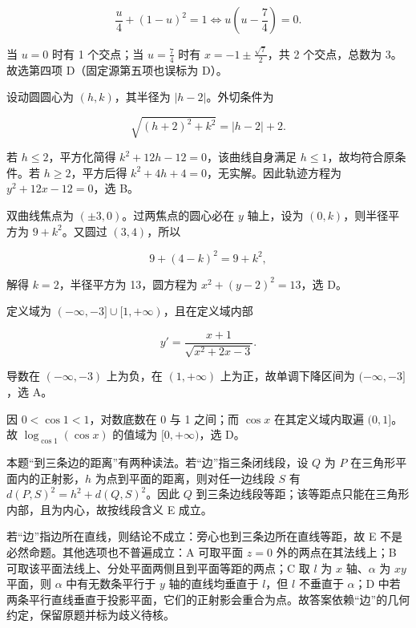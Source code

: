 \begin{answer}
\nopagebreak[4]
\[
\frac u4+(1-u)^2=1
\Longleftrightarrow u\left(u-\frac74\right)=0.
\]

当 $u=0$ 时有 1 个交点；当 $u=\frac74$ 时有 $x=-1\pm\frac{\sqrt7}{2}$，共 2 个交点，总数为 3。故选第四项 D（固定源第五项也误标为 D）。


设动圆圆心为 $(h,k)$，其半径为 $|h-2|$。外切条件为

\nopagebreak[4]
\[
\sqrt{(h+2)^2+k^2}=|h-2|+2.
\]

若 $h\le2$，平方化简得 $k^2+12h-12=0$，该曲线自身满足 $h\le1$，故均符合原条件。若 $h\ge2$，平方后得 $k^2+4h+4=0$，无实解。因此轨迹方程为 $y^2+12x-12=0$，选 B。


双曲线焦点为 $(\pm3,0)$。过两焦点的圆心必在 $y$ 轴上，设为 $(0,k)$，则半径平方为 $9+k^2$。又圆过 $(3,4)$，所以

\nopagebreak[4]
\[
9+(4-k)^2=9+k^2,
\]

解得 $k=2$，半径平方为 13，圆方程为 $x^2+(y-2)^2=13$，选 D。


定义域为 $(-\infty,-3]\cup[1,+\infty)$，且在定义域内部

\nopagebreak[4]
\[
y'=\frac{x+1}{\sqrt{x^2+2x-3}}.
\]

导数在 $(-\infty,-3)$ 上为负，在 $(1,+\infty)$ 上为正，故单调下降区间为 $(-\infty,-3]$，选 A。


因 $0<\cos1<1$，对数底数在 0 与 1 之间；而 $\cos x$ 在其定义域内取遍 $(0,1]$。故 $\log_{\cos1}(\cos x)$ 的值域为 $[0,+\infty)$，选 D。


本题“到三条边的距离”有两种读法。若“边”指三条闭线段，设 $Q$ 为 $P$ 在三角形平面内的正射影，$h$ 为点到平面的距离，则对任一边线段 $S$ 有 $d(P,S)^2=h^2+d(Q,S)^2$。因此 $Q$ 到三条边线段等距；该等距点只能在三角形内部，且为内心，故按线段含义 E 成立。

若“边”指边所在直线，则结论不成立：旁心也到三条边所在直线等距，故 E 不是必然命题。其他选项也不普遍成立：A 可取平面 $z=0$ 外的两点在其法线上；B 可取该平面法线上、分处平面两侧且到平面等距的两点；C 取 $l$ 为 $x$ 轴、$\alpha$ 为 $xy$ 平面，则 $\alpha$ 中有无数条平行于 $y$ 轴的直线均垂直于 $l$，但 $l$ 不垂直于 $\alpha$；D 中若两条平行直线垂直于投影平面，它们的正射影会重合为点。故答案依赖“边”的几何约定，保留原题并标为歧义待核。


\end{answer}
